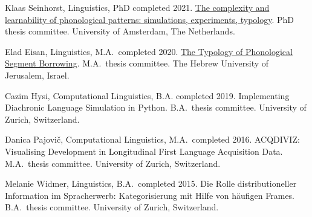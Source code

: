 \documentclass[11pt]{article}
\newcommand{\hangpara}{
 \setlength{\parindent}{0in} %
 \hangindent=0.42in %
}
\begin{document}
\hangpara
\vskip 6pt
Klaas Seinhorst, Linguistics, PhD completed 2021. \href{https://www.fon.hum.uva.nl/klaas/KlaasSeinhorstDissertation.pdf}{The complexity and learnability of phonological patterns: simulations, experiments, typology}. PhD thesis committee. University of Amsterdam, The Netherlands.

\hangpara
\vskip 6pt
Elad Eisan, Linguistics, M.A.\ completed 2020. \href{https://www.researchgate.net/publication/341734023_The_Typology_of_Phonological_Segment_Borrowing}{The Typology of Phonological Segment Borrowing}. M.A.\ thesis committee. The Hebrew University of Jerusalem, Israel.

\hangpara
\vskip 6pt
Cazim Hysi, Computational Linguistics, B.A. completed 2019. Implementing Diachronic Language Simulation in Python. B.A.\ thesis committee. University of Zurich, Switzerland.

\hangpara
\vskip 6pt
Danica Pajovi{\v c}, Computational Linguistics, M.A.\ completed 2016. ACQDIVIZ: Visualising Development in Longitudinal First Language Acquisition Data. M.A.\ thesis committee. University of Zurich, Switzerland.

\vskip 6pt
\hangpara
Melanie Widmer, Linguistics, B.A.\ completed 2015. Die Rolle distributioneller Information im Spracherwerb: Kategorisierung mit Hilfe von h{\"a}ufigen Frames. B.A.\ thesis committee. University of Zurich, Switzerland.


\end{document}
